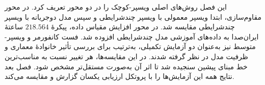 
این فصل روش‌های اصلی ویسپر-کوچک را در دو محور تعریف کرد. در محور مقاوم‌سازی، ابتدا ویسپر معمولی با ویسپر چندشرایطی و سپس مدل دوجریانه با ویسپر چندشرایطی مقایسه شد. در محور افزایش مقیاس داده، پیکرهٔ $218.564$ ساعتهٔ ایران‌صدا به داده‌های آموزشی مدل چندشرایطی افزوده شد. فست کانفورمر و ویسپر-متوسط نیز به‌عنوان دو آزمایش تکمیلی، به‌ترتیب برای بررسی تأثیر خانوادهٔ معماری و ظرفیت مدل در نظر گرفته شدند. در این مقایسه‌ها، هر تغییر نسبت به مناسب‌ترین خط مبنای پیشین سنجیده شد تا اثر آن به‌صورت مستقل‌تر مشخص شود. فصل بعد نتایج همه این آزمایش‌ها را با پروتکل ارزیابی یکسان گزارش و مقایسه می‌کند.
